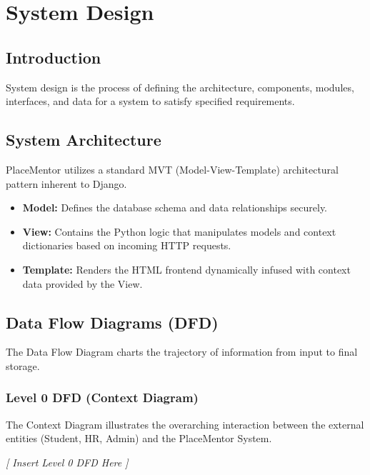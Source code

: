 \documentclass[a4paper,12pt]{report}
\begin{document}
\chapter{System Design}

\section{Introduction}

System design is the process of defining the architecture, components, modules, interfaces, and data for a system to satisfy specified requirements.

\section{System Architecture}

PlaceMentor utilizes a standard MVT (Model-View-Template) architectural pattern inherent to Django.
\begin{itemize}
    \item \textbf{Model:} Defines the database schema and data relationships securely.
    \item \textbf{View:} Contains the Python logic that manipulates models and context dictionaries based on incoming HTTP requests.
    \item \textbf{Template:} Renders the HTML frontend dynamically infused with context data provided by the View.
\end{itemize}

\section{Data Flow Diagrams (DFD)}

The Data Flow Diagram charts the trajectory of information from input to final storage.

\subsection{Level 0 DFD (Context Diagram)}
The Context Diagram illustrates the overarching interaction between the external entities (Student, HR, Admin) and the PlaceMentor System.

\vspace{1cm}
\begin{center}
\textit{[ Insert Level 0 DFD Here ]}
\end{center}
\vspace{1cm}
\end{document}

